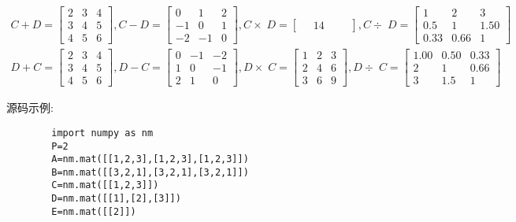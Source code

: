 \documentclass[UTF8,a4paper,notitlepage,openany,plain,final]{ctexbook}
\begin{document}
    \[ \begin{split}
        C + D =
        \begin{bmatrix}
            2 & 3 & 4 \\
            3 & 4 & 5 \\
            4 & 5 & 6
        \end{bmatrix}
        , C - D =
        \begin{bmatrix}
             0 &  1 & 2 \\
            -1 &  0 & 1 \\
            -2 & -1 & 0
        \end{bmatrix}
        , C \times\; D =
        \begin{bmatrix}
            \quad 14 \quad\quad
        \end{bmatrix}
        , C \div\; D =
        \begin{bmatrix}
            1    & 2    & 3   \\
            0.5  & 1    & 1.50 \\
            0.33 & 0.66 & 1
        \end{bmatrix}
        \\
        D + C =
        \begin{bmatrix}
            2 & 3 & 4 \\
            3 & 4 & 5 \\
            4 & 5 & 6
        \end{bmatrix}
        , D - C =
        \begin{bmatrix}
            0 & -1 & -2 \\
            1 &  0 & -1 \\
            2 &  1 &  0
        \end{bmatrix}
        , D \times\; C =
        \begin{bmatrix}
            1 & 2 & 3 \\
            2 & 4 & 6 \\
            3 & 6 & 9
        \end{bmatrix}
        , D \div\; C =
        \begin{bmatrix}
            1.00 & 0.50 & 0.33 \\
            2   & 1    & 0.66 \\
            3   & 1.5  & 1
        \end{bmatrix}
    \end{split} \]
    
    源码示例:
    \begin{verbatim}
        import numpy as nm
        P=2
        A=nm.mat([[1,2,3],[1,2,3],[1,2,3]])
        B=nm.mat([[3,2,1],[3,2,1],[3,2,1]])
        C=nm.mat([[1,2,3]])
        D=nm.mat([[1],[2],[3]])
        E=nm.mat([[2]])
    \end{verbatim}

		
\end{document}
